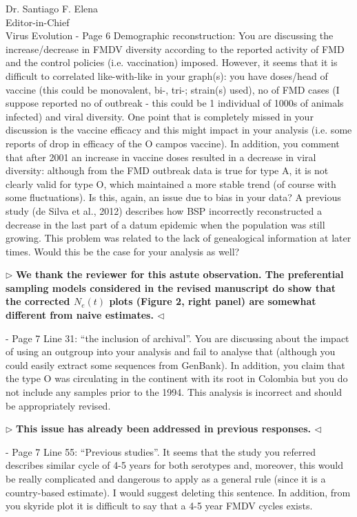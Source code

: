 \documentclass[ucla,biomath,12pt,noaddrfooter,datefrom]{UC_letter}
\newenvironment{reply}{$\triangleright$\bf}{$\triangleleft$}
\begin{document}
\begin{letter}{
Dr. Santiago F. Elena \\
Editor-in-Chief \\
Virus Evolution
}
-       Page 6 Demographic reconstruction: You are discussing the increase/decrease in FMDV diversity according to the reported activity of FMD and the control policies (i.e. vaccination) imposed. 
However, it seems that it is difficult to correlated like-with-like in your graph(s): you have doses/head of vaccine (this could be monovalent, bi-, tri-; strain(s) used), no of FMD cases (I suppose reported no of outbreak - this could be 1 individual of 1000s of animals infected) and viral diversity. 
One point that is completely missed in your discussion is the vaccine efficacy and this might impact in your analysis (i.e. some reports of drop in efficacy of the O campos vaccine). 
In addition, you comment that after 2001 an increase in vaccine doses resulted in a decrease in viral diversity: although from the FMD outbreak data is true for type A, it is not clearly valid for type O, which maintained a more stable trend (of course with some fluctuations). 
Is this, again, an issue due to bias in your data? A previous study (de Silva et al., 2012) describes how BSP incorrectly reconstructed a decrease in the last part of a datum epidemic when the population was still growing. 
This problem was related to the lack of genealogical information at later times. Would this be the case for your analysis as well?

\begin{reply}
We thank the reviewer for this astute observation.
The preferential sampling models considered in the revised manuscript do show that the corrected $N_e(t)$ plots (Figure 2, right panel) are somewhat different from naive estimates.
\end{reply}

-       Page 7 Line 31: ``the inclusion of archival''. 
You are discussing about the impact of using an outgroup into your analysis and fail to analyse that (although you could easily extract some sequences from GenBank). 
In addition, you claim that the type O was circulating in the continent with its root in Colombia but you do not include any samples prior to the 1994. 
This analysis is incorrect and should be appropriately revised.

\begin{reply}
This issue has already been addressed in previous responses.
\end{reply}

-       Page 7 Line 55: ``Previous studies''. 
It seems that the study you referred describes similar cycle of 4-5 years for both serotypes and, moreover, this would be really complicated and dangerous to apply as a general rule (since it is a country-based estimate). 
I would suggest deleting this sentence. In addition, from you skyride plot it is difficult to say that a 4-5 year FMDV cycles exists.


\end{letter}
\end{document}
